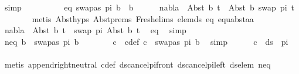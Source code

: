 \begin{isabellebody}
\ simp\isanewline
\ \ \isamarkupfalse%
\ \isanewline
\ \ \isakeywordONE{{\isacharbraceleft}{\kern0pt}}\isamarkupfalse%
\ \isamarkupfalse%
\ eq{\isacharcolon}{\kern0pt}\ {\isachardoublequoteopen}swapas\ pi\ b\ {\isacharequal}{\kern0pt}\ b{\isachardoublequoteclose}\isanewline
\ \ \ \ \isamarkupfalse%
\ {\isachardoublequoteopen}nabla\ {\isasymturnstile}\ Abst\ b\ t{\isacharprime}{\kern0pt}\ {\isasymapprox}\ Abst\ b\ {\isacharparenleft}{\kern0pt}swap\ pi\ t{\isacharprime}{\kern0pt}{\isacharparenright}{\kern0pt}{\isachardoublequoteclose}\isanewline
\ \ \ \ \ \ \isamarkupfalse%
\ {\isacharparenleft}{\kern0pt}metis\ Abst{\isachardot}{\kern0pt}hyps\ Abst{\isachardot}{\kern0pt}prems\ Fresh{\isacharunderscore}{\kern0pt}elims{\isacharparenleft}{\kern0pt}{}{\isacharparenright}{\kern0pt}\ elem{\isacharunderscore}{\kern0pt}ds\ eq\ equ{\isacharunderscore}{\kern0pt}abst{\isacharunderscore}{\kern0pt}aa{\isacharparenright}{\kern0pt}\isanewline
\ \ \ \ \isamarkupfalse%
\ \isamarkupfalse%
\ {\isachardoublequoteopen}nabla\ {\isasymturnstile}\ Abst\ b\ t{\isacharprime}{\kern0pt}\ {\isasymapprox}\ swap\ pi\ {\isacharparenleft}{\kern0pt}Abst\ b\ t{\isacharprime}{\kern0pt}{\isacharparenright}{\kern0pt}{\isachardoublequoteclose}\ \isamarkupfalse%
\ eq\ \isamarkupfalse%
\ simp\isanewline
\ \ \isakeywordONE{{\isacharbraceright}{\kern0pt}}\isamarkupfalse%
\isanewline
\ \ \isamarkupfalse%
\isanewline
\ \ \isakeywordONE{{\isacharbraceleft}{\kern0pt}}\isamarkupfalse%
\ \isamarkupfalse%
\ neq{\isacharcolon}{\kern0pt}\ {\isachardoublequoteopen}b\ {\isasymnoteq}\ swapas\ pi\ b{\isachardoublequoteclose}\ \ \isanewline
\ \ \ \ \isamarkupfalse%
\ c\ \ c{\isacharunderscore}{\kern0pt}def{\isacharcolon}{\kern0pt}\ {\isachardoublequoteopen}c\ {\isacharequal}{\kern0pt}\ swapas\ pi\ b{\isachardoublequoteclose}\ \isamarkupfalse%
\ simp\isanewline
\ \ \ \ \isamarkupfalse%
\ {\isachardoublequoteopen}c\ {\isasymin}\ ds\ {\isacharbrackleft}{\kern0pt}{\isacharbrackright}{\kern0pt}\ pi{\isachardoublequoteclose}\isanewline
\ \ \ \ \ \ \isamarkupfalse%
\ {\isacharparenleft}{\kern0pt}metis\ append{\isachardot}{\kern0pt}right{\isacharunderscore}{\kern0pt}neutral\ c{\isacharunderscore}{\kern0pt}def\ ds{\isacharunderscore}{\kern0pt}cancel{\isacharunderscore}{\kern0pt}pi{\isacharunderscore}{\kern0pt}front\ ds{\isacharunderscore}{\kern0pt}cancel{\isacharunderscore}{\kern0pt}pi{\isacharunderscore}{\kern0pt}left\ ds{\isacharunderscore}{\kern0pt}elem\ neq{\isacharparenright}{\kern0pt}\isanewline

\end{isabellebody}
